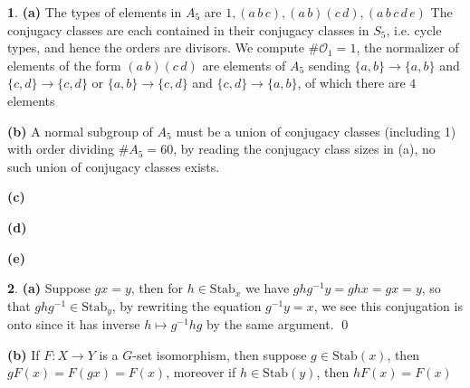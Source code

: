 \documentclass[10.5pt]{article}
\theoremstyle{definition}
\newtheorem{pb}{}
\newcommand{\set}[1]{\{#1\}}
\begin{document}
    \begin{pb}
        \textbf{(a)}
            The types of elements in \(A_5\) are \(1,(a\,b\,c), (a\,b)(c\,d),(a\,b\,c\,d\,e)\) The conjugacy classes are each contained in their conjugacy classes in \(S_5\), i.e. cycle types, and hence the orders are divisors. We compute \(\#\mathcal{O}_1 = 1\), the normalizer of elements of the form \((a\,b)(c\,d)\) are elements of \(A_5\) sending \(\set{a,b} \to \set{a,b}\) and \(\set{c,d} \to \set{c,d}\) or \(\set{a,b} \to \set{c,d}\) and \(\set{c,d} \to \set{a,b}\), of which there are \(4\) elements

        \textbf{(b)} A normal subgroup of \(A_5\) must be a union of conjugacy classes (including 1) with order dividing \(\#A_5 = 60\), by reading the conjugacy class sizes in (a), no such union of conjugacy classes exists.

        \textbf{(c)}

        \textbf{(d)}

        \textbf{(e)}
    \end{pb}
    \begin{pb}
        \textbf{(a)} Suppose \(gx = y\), then for \(h \in \text{Stab}_x\) we have \(ghg^{-1}y = ghx = gx = y\), so that \(ghg^{-1} \in \text{Stab}_y\), by rewriting the equation \(g^{-1}y = x\), we see this conjugation is onto since it has inverse \(h \mapsto g^{-1}hg\) by the same argument. \qed
        
        \textbf{(b)} If \(F: X \to Y\) is a \(G\)-set isomorphism, then suppose \(g \in \text{Stab}(x)\), then \(gF(x) = F(gx) = F(x)\), moreover if \(h \in \text{Stab}(y)\), then \(hF(x) = F(x)\)
    \end{pb}
\end{document}
